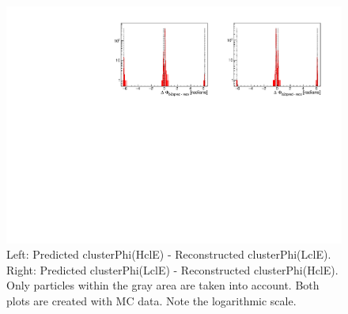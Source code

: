 \documentclass[a4paper,11pt,twosided,final,german,openbib,pdftex,listof=totoc,bibliography=totoc]{scrbook}
\begin{document}
\begin{appendix}
\begin{figure}[!htbp]
	\centering
	\includegraphics[width=\textwidth]{Plots/master/sb2b_MC_0.pdf}
	\caption[b2bClusterPhi - clusterPhi For MC (Whole Range)]{Left: Predicted clusterPhi(HclE) - Reconstructed clusterPhi(LclE). Right: Predicted clusterPhi(LclE) - Reconstructed clusterPhi(HclE). Only particles within the gray area are taken into account. Both plots are created with MC data. Note the logarithmic scale.}
	\label{fig:b2bMC_Whole}
\end{figure}
\newpage










\end{appendix}
\end{document}
